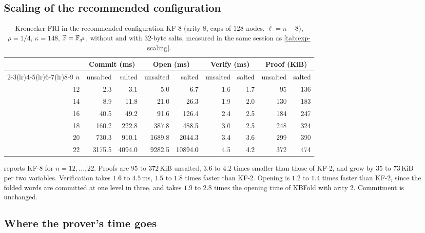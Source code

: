 \subsection{Scaling of the recommended configuration}\label{sec:exp:kf8}

\begin{table}[t]
\centering
\small
\setlength{\tabcolsep}{4pt}
\begin{tabular}{r rr rr rr rr}
\toprule
 & \multicolumn{2}{c}{Commit (ms)} & \multicolumn{2}{c}{Open (ms)} & \multicolumn{2}{c}{Verify (ms)} & \multicolumn{2}{c}{Proof (KiB)} \\
\cmidrule(lr){2-3}\cmidrule(lr){4-5}\cmidrule(lr){6-7}\cmidrule(lr){8-9}
$n$ & unsalted & salted & unsalted & salted & unsalted & salted & unsalted & salted \\
\midrule
12 & 2.3 & 3.1 & 5.0 & 6.7 & 1.6 & 1.7 & 95 & 136 \\
14 & 8.9 & 11.8 & 21.0 & 26.3 & 1.9 & 2.0 & 130 & 183 \\
16 & 40.5 & 49.2 & 91.6 & 126.4 & 2.4 & 2.5 & 184 & 247 \\
18 & 160.2 & 222.8 & 387.8 & 488.5 & 3.0 & 2.5 & 248 & 324 \\
20 & 730.3 & 910.1 & 1689.8 & 2044.3 & 3.4 & 3.6 & 299 & 390 \\
22 & 3175.5 & 4094.0 & 9282.5 & 10894.0 & 4.5 & 4.2 & 372 & 474 \\
\bottomrule
\end{tabular}
\caption{Kronecker-FRI in the recommended configuration KF-8 (arity $8$, caps of $128$ nodes, $\ell = n - 8$), $\rho = 1/4$, $\kappa = 148$, $\mathbb{F} = \mathbb{F}_{q^2}$, without and with $32$-byte salts, measured in the same session as \cref{tab:exp-scaling}.}
\label{tab:exp-kf8}
\end{table}

 reports KF-8 for $n = 12, \dots, 22$.
Proofs are $95$ to $372$\,KiB unsalted, $3.6$ to $4.2$ times smaller than those of KF-2, and grow by $35$ to $73$\,KiB per two variables. Verification takes $1.6$ to $4.5$\,ms, $1.5$ to $1.8$ times faster than KF-2. Opening is $1.2$ to $1.4$ times faster than KF-2, since the folded words are committed at one level in three, and takes $1.9$ to $2.8$ times the opening time of KBFold with arity $2$. Commitment is unchanged.

\subsection{Where the prover's time goes}\label{sec:exp:breakdown}

